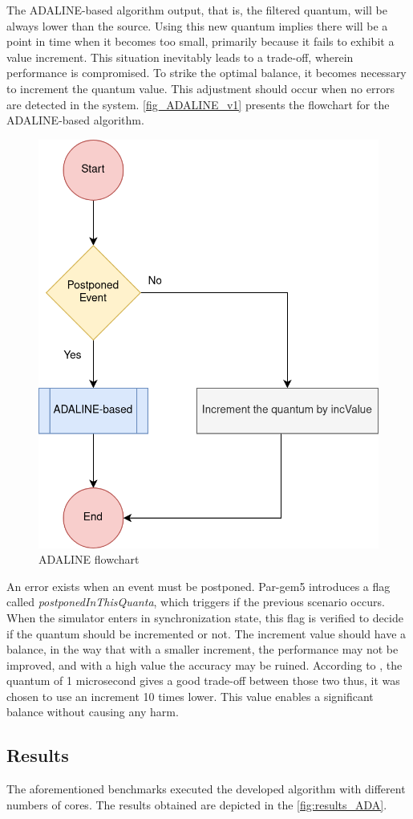 The ADALINE-based algorithm output, that is, the filtered quantum, will be always lower than the source. Using this new quantum implies there will 
be a point in time when it becomes too small, primarily because it fails to exhibit a value increment. This situation inevitably leads to a 
trade-off, wherein performance is compromised. To strike the optimal balance, it becomes necessary to increment the quantum value. This adjustment 
should occur when no errors are detected in the system. \autoref{fig_ADALINE_v1} presents the flowchart for the ADALINE-based algorithm.

\begin{figure}[H]
 	\includegraphics[width=0.32\linewidth]{Images/ADALINE_v1.png}
 	\caption{ADALINE flowchart}
	 \label{fig_ADALINE_v1}
\end{figure}

An error exists when an event must be postponed. Par-gem5 \cite{pargem5} introduces a flag called \textit{postponedInThisQuanta}, which triggers 
if the previous scenario occurs. When the simulator enters in synchronization state, this flag is verified to decide if the quantum should be 
incremented or not. The increment value should have a balance, in the way that with a smaller increment, the performance may not be improved, and 
with a high value the accuracy may be ruined. According to \cite{pargem5}, the quantum of 1 microsecond gives a good trade-off between those 
two thus, it was chosen to use an increment 10 times lower. This value enables a significant balance without causing any harm.

\subsection{Results}
\label{sec:ADALINE_results}

The aforementioned benchmarks executed the developed algorithm with different numbers of cores. The results obtained are depicted in the 
\autoref{fig:results_ADA}. 


